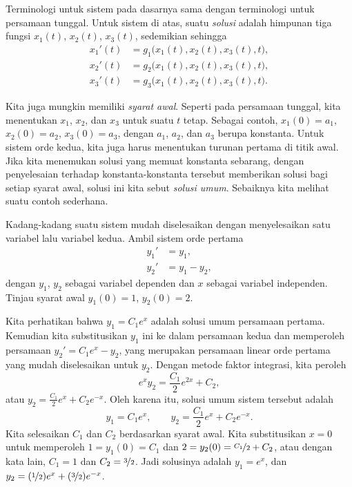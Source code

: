 Terminologi untuk sistem pada dasarnya sama dengan terminologi untuk
persamaan tunggal.
Untuk sistem di atas, suatu
\emph{solusi}
adalah himpunan tiga fungsi $x_1(t)$, $x_2(t)$, $x_3(t)$, sedemikian sehingga
\begin{equation*}
\begin{aligned}
x_1'(t) &= g_1\bigl(x_1(t),x_2(t),x_3(t),t\bigr) , \\
x_2'(t) &= g_2\bigl(x_1(t),x_2(t),x_3(t),t\bigr) , \\
x_3'(t) &= g_3\bigl(x_1(t),x_2(t),x_3(t),t\bigr) .
\end{aligned}
\end{equation*}

Kita juga mungkin memiliki
\emph{syarat awal}.
Seperti pada persamaan tunggal, kita menentukan $x_1$, $x_2$, dan $x_3$ untuk suatu $t$ tetap.
Sebagai contoh, $x_1(0) = a_1$, $x_2(0) = a_2$, $x_3(0) = a_3$,
dengan $a_1$, $a_2$, dan $a_3$ berupa konstanta.
Untuk sistem orde kedua,
kita juga harus menentukan turunan pertama di titik awal.
Jika kita menemukan solusi yang memuat konstanta sebarang,
dengan penyelesaian terhadap konstanta-konstanta tersebut memberikan solusi bagi
setiap syarat awal, solusi ini kita sebut
\emph{solusi umum}.
Sebaiknya kita melihat suatu contoh sederhana.

\begin{example} \label{example:simplesystem}
Kadang-kadang suatu sistem mudah diselesaikan
dengan menyelesaikan satu variabel lalu variabel kedua.
Ambil
sistem orde pertama
\begin{equation*}
\begin{aligned}
y_1' & = y_1 , \\
y_2' & = y_1 - y_2 ,
\end{aligned}
\end{equation*}
dengan $y_1$, $y_2$ sebagai variabel dependen dan $x$ sebagai variabel
independen.  Tinjau syarat awal
$y_1(0) = 1$, $y_2(0) = 2$.

Kita perhatikan bahwa $y_1 = C_1 e^x$ adalah solusi umum persamaan pertama.
Kemudian kita substitusikan $y_1$ ini ke dalam persamaan kedua
dan memperoleh persamaan $y_2' = C_1e^x - y_2$, yang merupakan persamaan linear
orde pertama
yang mudah diselesaikan untuk $y_2$.
Dengan metode faktor integrasi, kita peroleh
\begin{equation*}
e^x y_2 = \frac{C_1}{2}e^{2x} + C_2 ,
\end{equation*}
atau $y_2 = \frac{C_1}{2}e^{x} + C_2e^{-x}$.  Oleh karena itu, solusi umum sistem tersebut
adalah
\begin{equation*}
y_1 = C_1 e^x , \qquad
y_2 = \frac{C_1}{2}e^{x} + C_2e^{-x} .
\end{equation*}
Kita selesaikan $C_1$ dan $C_2$ berdasarkan syarat awal.
Kita substitusikan $x=0$ untuk memperoleh
$1 = y_1(0) = C_1$ dan
$2 = y_2(0) = \nicefrac{C_1}{2} + C_2$,
atau dengan kata lain,
$C_1=1$ dan $C_2=\nicefrac{3}{2}$.  Jadi solusinya adalah
$y_1 = e^x$, dan
$y_2 = (\nicefrac{1}{2}) e^x + (\nicefrac{3}{2}) e^{-x}$.
\end{example}

